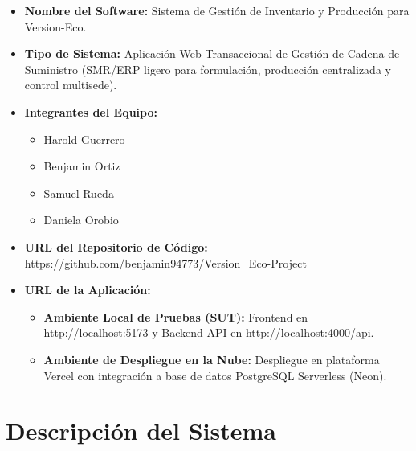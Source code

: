\documentclass[11pt,a4paper]{article}
\begin{document}
\begin{itemize}[leftmargin=1.5cm]
    \item \textbf{Nombre del Software:} Sistema de Gestión de Inventario y Producción para Version-Eco.
    \item \textbf{Tipo de Sistema:} Aplicación Web Transaccional de Gestión de Cadena de Suministro (SMR/ERP ligero para formulación, producción centralizada y control multisede).
    \item \textbf{Integrantes del Equipo:}
    \begin{itemize}
        \item Harold Guerrero
        \item Benjamin Ortiz
        \item Samuel Rueda
        \item Daniela Orobio
    \end{itemize}
    \item \textbf{URL del Repositorio de Código:} \url{https://github.com/benjamin94773/Version_Eco-Project}
    \item \textbf{URL de la Aplicación:}
    \begin{itemize}
        \item \textbf{Ambiente Local de Pruebas (SUT):} Frontend en \url{http://localhost:5173} y Backend API en \url{http://localhost:4000/api}.
        \item \textbf{Ambiente de Despliegue en la Nube:} Despliegue en plataforma Vercel con integración a base de datos PostgreSQL Serverless (Neon).
    \end{itemize}
\end{itemize}

\section{Descripción del Sistema}
\end{document}
